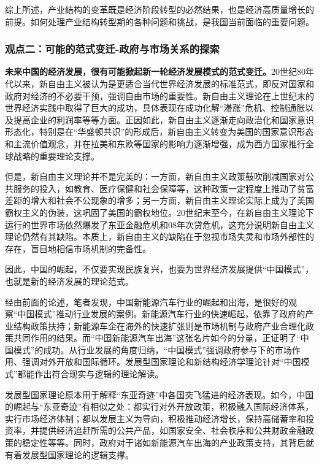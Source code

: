 \documentclass[a4paper, 10pt]{article}
\begin{document}
综上所述，产业结构的变革既是经济阶段转型的必然结果，也是经济高质量增长的前提。如何处理产业结构转型期的各种问题和挑战，是我国当前面临的重要问题。

  \subsubsection{观点二：可能的范式变迁-政府与市场关系的探索}
  \textbf{未来中国的经济发展，很有可能掀起新一轮经济发展模式的范式变迁。}20世纪80年代以来，新自由主义被认为是更适合当代世界经济发展的标准范式，即反对国家和政府对经济的不必要干预，强调自由市场的重要性。新自由主义理论在上世纪末的世界经济实践中取得了巨大的成功，具体表现在成功化解“滞涨”危机、控制通胀以及提高企业的利润率等等方面。正因如此，新自由主义逐渐走向政治化和国家意识形态化，特别是在“华盛顿共识”的形成后，新自由主义转变为美国的国家意识形态和主流价值观念，并在拉美和东欧等国家的影响力逐渐增强，成为西方国家推行全球战略的重要理论支撑。

  

  但是，新自由主义理论并不是完美的：一方面，新自由主义政策鼓吹削减国家对公共服务的投入，如教育、医疗保健和社会保障等，这种政策一定程度上推动了贫富差距的增大和社会不公现象的增多；另一方面，新自由主义理论实际上成为了美国霸权主义的伪装，这巩固了美国的霸权地位。20世纪末至今，在新自由主义理论下运行的世界市场依然爆发了东亚金融危机和08年次贷危机，这充分说明新自由主义理论仍然有其缺陷。本质上，新自由主义的缺陷在于忽视市场失灵和市场外部性的存在，盲目地相信市场机制的完备性。

  因此，中国的崛起，不仅要实现民族复兴，也要为世界经济发展提供“中国模式”，也就是新的经济发展的理论范式。

  经由前面的论述，笔者发现，中国新能源汽车行业的崛起和出海，是很好的观察“中国模式”推动行业发展的案例。新能源汽车行业的快速崛起，依靠了政府的产业结构政策扶持；新能源车企在海外的快速扩张则是市场机制与政府产业合理化政策共同作用的结果。而“中国新能源汽车出海”这张名片如今的分量，正证明了“中国模式”的成功。从行业发展的角度归纳，“中国模式”强调政府参与下的市场作用、强调对外开放和国际循环。发展型国家理论和新结构经济学理论针对“中国模式”都能作出符合现实与逻辑的理论解读。
  
  发展型国家理论原本用于解释“东亚奇迹”中各国突飞猛进的经济表现。如今，中国的崛起与“东亚奇迹”有相似之处：都实行对外开放政策，积极融入国际经济体系，实行市场经济体制；都以发展主义为导向，积极推动经济增长，保持高储蓄率和投资率，并提供经济追赶所需的公共产品，如国家安全、社会秩序和公共财政金融政策的稳定性等等。同时，政府对于诸如新能源汽车出海的产业政策支持，其背后就有着发展型国家理论的逻辑支撑。
\end{document}
